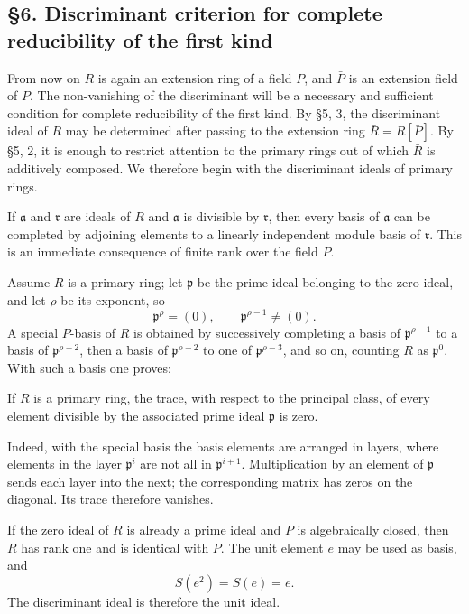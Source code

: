 \documentclass[
  12pt,
]{article}
\begin{document}
\subsection{§6. Discriminant criterion for complete reducibility of the
first
kind}\label{discriminant-criterion-for-complete-reducibility-of-the-first-kind}

From now on \(R\) is again an extension ring of a field \(P\), and
\(\bar P\) is an extension field of \(P\). The non-vanishing of the
discriminant will be a necessary and sufficient condition for complete
reducibility of the first kind. By §5, 3, the discriminant ideal of
\(R\) may be determined after passing to the extension ring
\(\bar R=R[\bar P]\). By §5, 2, it is enough to restrict attention to
the primary rings out of which \(\bar R\) is additively composed. We
therefore begin with the discriminant ideals of primary rings.

If \(\mathfrak a\) and \(\mathfrak r\) are ideals of \(R\) and
\(\mathfrak a\) is divisible by \(\mathfrak r\), then every basis of
\(\mathfrak a\) can be completed by adjoining elements to a linearly
independent module basis of \(\mathfrak r\). This is an immediate
consequence of finite rank over the field \(P\).

Assume \(R\) is a primary ring; let \(\mathfrak p\) be the prime ideal
belonging to the zero ideal, and let \(\rho\) be its exponent, so \[
  \mathfrak p^{\rho}=(0),
  \qquad \mathfrak p^{\rho-1}\ne(0).
\] A special \(P\)-basis of \(R\) is obtained by successively completing
a basis of \(\mathfrak p^{\rho-1}\) to a basis of
\(\mathfrak p^{\rho-2}\), then a basis of \(\mathfrak p^{\rho-2}\) to
one of \(\mathfrak p^{\rho-3}\), and so on, counting \(R\) as
\(\mathfrak p^0\). With such a basis one proves:

If \(R\) is a primary ring, the trace, with respect to the principal
class, of every element divisible by the associated prime ideal
\(\mathfrak p\) is zero.

Indeed, with the special basis the basis elements are arranged in
layers, where elements in the layer \(\mathfrak p^i\) are not all in
\(\mathfrak p^{i+1}\). Multiplication by an element of \(\mathfrak p\)
sends each layer into the next; the corresponding matrix has zeros on
the diagonal. Its trace therefore vanishes.

If the zero ideal of \(R\) is already a prime ideal and \(P\) is
algebraically closed, then \(R\) has rank one and is identical with
\(P\). The unit element \(e\) may be used as basis, and \[
  S(e^2)=S(e)=e.
\] The discriminant ideal is therefore the unit ideal.
\end{document}
